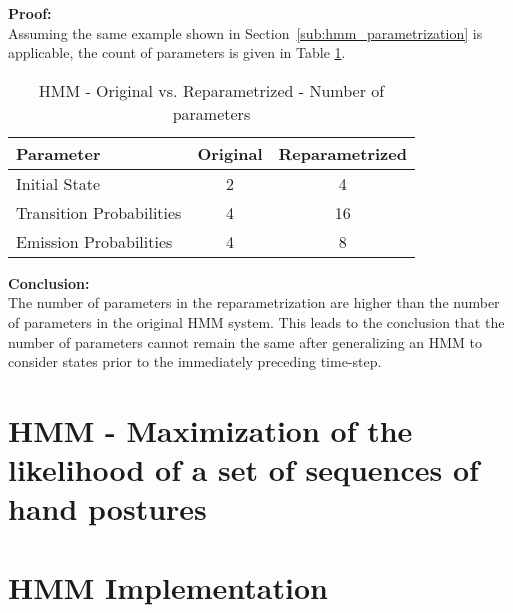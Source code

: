 \documentclass[parskip=half]{scrartcl}
\begin{document}
        \textbf{Proof:}\\
        Assuming the same example shown in Section~\ref{sub:hmm_parametrization} is applicable, the count of parameters is given in Table \ref{tab:hmm-original-vs-reparametrized}.
        \begin{table}[th]
            \centering
            \begin{tabular}{| l | c | c |}
            \hline
            \textbf{Parameter} & \textbf{Original} & \textbf{Reparametrized} \\
            \hline
            \hline
                Initial State & 2 & 4 \\
            \hline
                Transition Probabilities & 4 & 16 \\
            \hline
                Emission Probabilities & 4 & 8 \\
            \hline
            \end{tabular}
            \caption{HMM - Original vs. Reparametrized - Number of parameters}
            \label{tab:hmm-original-vs-reparametrized}
        \end{table}

        \textbf{Conclusion:}\\
        The number of parameters in the reparametrization are higher than the number of parameters in the original HMM system. This leads to the conclusion that the number of parameters cannot remain the same after generalizing an HMM to consider states prior to the immediately preceding time-step.
    



\newpage


\section{HMM - Maximization of the likelihood of a set of sequences of hand postures} %
\label{sec:hmm_maximization_of_the_likelihood_of_a_set_of_sequences_of_hand_postures}

    



\newpage


\section{HMM Implementation} %
\label{sec:hmm_implementation}
\end{document}
